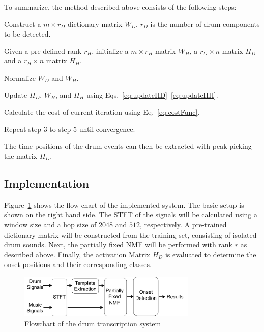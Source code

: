 \documentclass{article}
\newcommand{\figref}[1]{\mbox{Figure~\ref{#1}}}
\begin{document}
To summarize, the method described above consists of the following steps:
\begin{inparaenum}
    \item   Construct a $m \times r_D$ dictionary matrix $W_D$, $r_D$ is the number of drum components to be detected.
    \item   Given a pre-defined rank $r_H$, initialize a $m \times r_H$ matrix $W_H$, a $r_D \times n$ matrix $H_D$ and a $r_H \times n$ matrix $H_H$.
    \item   Normalize $W_D$ and $W_H$. 
    \item   Update $H_D$, $W_H$, and $H_H$ using Eqs.~\eqref{eq:updateHD}--\eqref{eq:updateHH}.
    \item   Calculate the cost of current iteration using Eq.~\eqref{eq:costFunc}.
    \item   Repeat step 3 to step 5 until convergence.
\end{inparaenum}

The time positions of the drum events can then be extracted with peak-picking the matrix $H_D$.

\subsection{Implementation}\label{subsec:processing steps}

\figref{fig:flowchart} shows the flow chart of the implemented system. The basic setup is shown on the right hand side. 
The STFT of the signals will be calculated using a window size and a hop size of $2048$ and $512$, respectively. 
A pre-trained dictionary matrix will be constructed from the training set, consisting of isolated drum sounds. 
Next, the partially fixed NMF will be performed with rank $r$ as described above. 
Finally, the activation Matrix $H_D$ is evaluated to determine the onset positions and their corresponding classes.  

\begin{figure}
 \centerline{%
 \includegraphics[width=8.5cm]{flowchart.png}}%
 \caption{Flowchart of the drum transcription system} %
 \label{fig:flowchart}
\end{figure}
\end{document}
